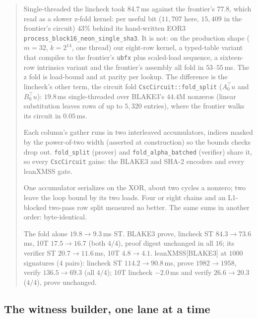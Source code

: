 \documentclass[11pt]{article}
\newcommand{\code}[1]{\texttt{#1}}
\newenvironment{optsummary}{%
  \begin{quote}\small
  \begin{description}
  \setlength{\itemsep}{1pt}\setlength{\parsep}{0pt}\setlength{\topsep}{2pt}
}{%
  \end{description}
  \end{quote}
}
\begin{document}
\begin{optsummary}
\item[Baseline:] Single-threaded the lincheck took $84.7\,$ms against the frontier's $77.8$, which read as a slower z-fold kernel: per useful bit ($11{,}707$ here, $15{,}409$ in the frontier's circuit) $43\%$ behind its hand-written EOR3 \code{process\_block16\_neon\_single\_sha3}. It is not: on the production shape ($m{=}32$, $k{=}2^{14}$, one thread) our eight-row kernel, a typed-table variant that compiles to the frontier's \code{ubfx} plus scaled-load sequence, a sixteen-row intrinsics variant and the frontier's assembly all fold in $53$--$55\,$ms. The z fold is load-bound and at parity per lookup. The difference is the lincheck's other term, the circuit fold \code{CscCircuit::fold\_split} ($A_0^{\top}u$ and $B_0^{\top}u$): $19.8\,$ms single-threaded over BLAKE3's $44.4$M nonzeros (linear substitution leaves rows of up to $5{,}320$ entries), where the frontier walks its circuit in $0.05\,$ms.
\item[Improvement:] Each column's gather runs in two interleaved accumulators, indices masked by the power-of-two width (asserted at construction) so the bounds checks drop out. \code{fold\_split} (prover) and \code{fold\_alpha\_batched} (verifier) share it, so every \code{CscCircuit} gains: the BLAKE3 and SHA-2 encoders and every leanXMSS gate.
\item[Mechanism:] One accumulator serializes on the XOR, about two cycles a nonzero; two leave the loop bound by its two loads. Four or eight chains and an L1-blocked two-pass row split measured no better. The same sums in another order: byte-identical.
\item[Result:] The fold alone $19.8\to9.3\,$ms ST. BLAKE3 prove, lincheck ST $84.3\to73.6\,$ms, 10T $17.5\to16.7$ (both $4/4$), proof digest unchanged in all $16$; its verifier ST $20.7\to11.6\,$ms, 10T $4.8\to4.1$. leanXMSS[BLAKE3] at $1000$ signatures ($4$ pairs): lincheck ST $114.2\to90.8\,$ms, prove $1982\to1958$, verify $136.5\to69.3$ (all $4/4$); 10T lincheck $-2.0\,$ms and verify $26.6\to20.3$ ($4/4$), prove unchanged.
\end{optsummary}

\subsection{The witness builder, one lane at a time}\label{sec:lanebuilder}
\end{document}
